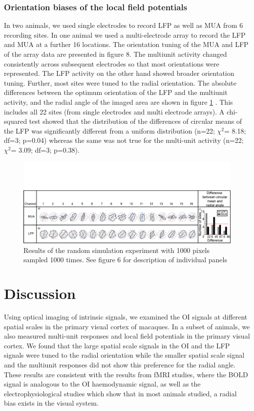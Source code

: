		\subsubsection{Orientation biases of the local field potentials}
		In two animals, we used single electrodes to record LFP as well as MUA from 6 recording sites. In one animal we used a multi-electrode array to record the LFP and MUA at a further 16 locations. The orientation tuning of the MUA and LFP of the array data are presented in figure 8. The multiunit activity changed consistently across subsequent electrodes so that most orientations were represented. The LFP activity on the other hand showed broader orientation tuning. Further, most sites were tuned to the radial orientation. The absolute differences between the optimum orientation of the LFP and the multiunit activity, and the radial angle of the imaged area are shown in figure \ref{fig:MUA} . This includes all 22 sites (from single electrodes and multi electrode arrays). A chi-squared test showed that the distribution of the differences of circular means of the LFP was significantly different from a uniform distribution (n=22;  $\chi^2$= 8.18; df=3; p=0.04) whereas the same was not true for the multi-unit activity (n=22;  $\chi^2$= 3.09; df=3; p=0.38).
				\begin{figure}[H]
					
					\includegraphics[width=\linewidth]{rb/FinalFigures/mua.jpg}
					\caption{Results of the random simulation experiment with 1000 pixels sampled 1000 times. See figure 6 for description of individual panels}
					\label{fig:MUA}
				\end{figure}
	
				\pagebreak
				
	\section{Discussion}
		
		Using optical imaging of intrinsic signals, we examined the OI signals at different spatial scales in the primary visual cortex of macaques. In a subset of animals, we also measured multi-unit responses and local field potentials in the primary visual cortex. We found that the large spatial scale signals in the OI and the LFP signals were tuned to the radial orientation while the smaller spatial scale signal and the multiunit responses did not show this preference for the radial angle. These results are consistent with the results from fMRI studies, where the BOLD signal is analogous to the OI haemodynamic signal, as well as the electrophysiological studies which show that in most animals studied, a radial bias exists in the visual system.
		
